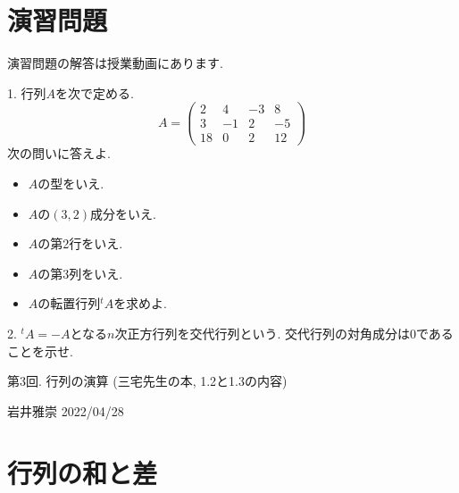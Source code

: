 \documentclass[dvipdfmx,a4paper,11pt]{article}
\theoremstyle{definition}
\begin{document}
\section{演習問題}
演習問題の解答は授業動画にあります.

1.  行列$A$を次で定める.
 $$
 A = 
 \begin{pmatrix}
 2 &4&-3&8 \\
 3&-1&2&-5 \\
  18&0&2&12
 \end{pmatrix}
 $$
 次の問いに答えよ.
 \begin{itemize}
 \item $A$の型をいえ.
 \item $A$の$(3,2)$成分をいえ.
  \item $A$の第2行をいえ.
 \item $A$の第3列をいえ.
 \item $A$の転置行列${}^{t}A$を求めよ.
 \end{itemize}
 
 2. ${}^{t}A =-A$となる$n$次正方行列を交代行列という. 交代行列の対角成分は0であることを示せ.


\newpage

\begin{center}
{\Large 第3回. 行列の演算 (三宅先生の本, 1.2と1.3の内容)}
\end{center}

\begin{flushright}
 岩井雅崇 2022/04/28
\end{flushright}



\section{行列の和と差}
\end{document}
